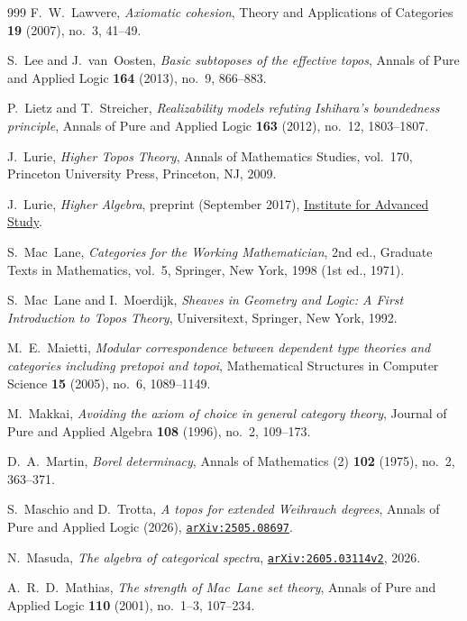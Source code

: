 \begin{thebibliography}{999}
F.~W.~Lawvere,
\emph{Axiomatic cohesion},
Theory and Applications of Categories \textbf{19} (2007), no.~3, 41--49.

S.~Lee and J.~van~Oosten,
\emph{Basic subtoposes of the effective topos},
Annals of Pure and Applied Logic \textbf{164} (2013), no.~9, 866--883.

P.~Lietz and T.~Streicher,
\emph{Realizability models refuting Ishihara's boundedness principle},
Annals of Pure and Applied Logic \textbf{163} (2012), no.~12, 1803--1807.

J.~Lurie,
\emph{Higher Topos Theory},
Annals of Mathematics Studies, vol.~170, Princeton University Press, Princeton, NJ, 2009.

J.~Lurie,
\emph{Higher Algebra},
preprint (September 2017), \href{https://www.math.ias.edu/~lurie/papers/HigherAlgebra.pdf}{Institute for Advanced Study}.

S.~Mac~Lane,
\emph{Categories for the Working Mathematician},
2nd ed., Graduate Texts in Mathematics, vol.~5, Springer, New York, 1998 (1st ed., 1971).

S.~Mac~Lane and I.~Moerdijk,
\emph{Sheaves in Geometry and Logic: A First Introduction to Topos Theory},
Universitext, Springer, New York, 1992.

M.~E.~Maietti,
\emph{Modular correspondence between dependent type theories and categories including pretopoi and topoi},
Mathematical Structures in Computer Science \textbf{15} (2005), no.~6, 1089--1149.

M.~Makkai,
\emph{Avoiding the axiom of choice in general category theory},
Journal of Pure and Applied Algebra \textbf{108} (1996), no.~2, 109--173.

D.~A.~Martin,
\emph{Borel determinacy},
Annals of Mathematics (2) \textbf{102} (1975), no.~2, 363--371.

S.~Maschio and D.~Trotta,
\emph{A topos for extended Weihrauch degrees},
Annals of Pure and Applied Logic (2026), \href{https://arxiv.org/abs/2505.08697}{\texttt{arXiv:2505.08697}}.

N.~Masuda,
\emph{The algebra of categorical spectra},
\href{https://arxiv.org/abs/2605.03114v2}{\texttt{arXiv:2605.03114v2}}, 2026.

A.~R.~D.~Mathias,
\emph{The strength of Mac~Lane set theory},
Annals of Pure and Applied Logic \textbf{110} (2001), no.~1--3, 107--234.


\end{thebibliography}
